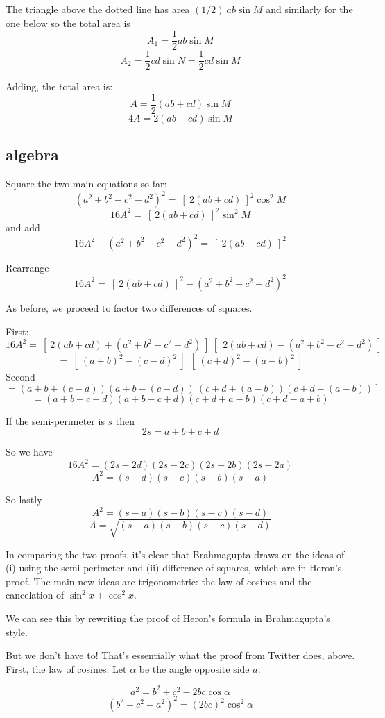 \documentclass[11pt, oneside]{article}
\begin{document}
The triangle above the dotted line has area $(1/2) \ ab \sin M$ and similarly for the one below so the total area is
\[ A_1 = \frac{1}{2} ab \sin M \]
\[ A_2 = \frac{1}{2} cd \sin N = \frac{1}{2} cd \sin M \]

Adding, the total area is:
\[ A  =  \frac{1}{2}(ab + cd) \sin M \]
\[ 4A =  2(ab + cd) \sin M \]

\subsection*{algebra}

Square the two main equations so far:
\[ (a^2 + b^2 - c^2 - d^2)^2 =  \ [ \ 2(ab + cd) \ ]^2 \cos^2 M \]
\[ 16A^2 =  \ [ \ 2(ab + cd) \ ]^2 \sin^2 M \]
and add
\[ 16A^2 + (a^2 + b^2 - c^2 - d^2)^2 =   \ [ \ 2(ab + cd) \ ]^2 \]

Rearrange
\[ 16A^2 =   \ [ \ 2(ab + cd) \ ]^2 - (a^2 + b^2 - c^2 - d^2)^2 \]

As before, we proceed to factor two differences of squares.  

First:
\[ 16A^2 =   \ [ \ 2(ab + cd) + (a^2 + b^2 - c^2 - d^2) \ ] \ [ \ \ 2(ab + cd) - (a^2 + b^2 - c^2 - d^2) \ ] \]
\[ = \ [ \ (a + b)^2 - (c - d)^2 \ ] \  \ [ \ (c + d)^2 - (a - b)^2 \ ] \]
Second
\[ = (a + b + (c - d))(a + b - (c - d)) \ (c + d + (a - b))(c + d - (a - b)) \ ] \]
\[ = (a + b + c - d)(a + b - c + d)(c + d + a - b)(c + d - a + b) \]

If the semi-perimeter is $s$ then
\[ 2s = a + b + c + d \]

So we have
\[ 16A^2 = (2s - 2d)(2s - 2c)(2s - 2b)(2s - 2a) \]
\[ A^2 = (s - d)(s - c)(s - b)(s - a) \]

So lastly
\[ A^2 = (s - a)(s - b)(s - c)(s - d) \]
\[ A = \sqrt{(s - a)(s - b)(s - c)(s - d)} \]

In comparing the two proofs, it's clear that Brahmagupta draws on the ideas of (i) using the semi-perimeter and (ii) difference of squares, which are in Heron's proof.  The main new ideas are trigonometric:  the law of cosines and the cancelation of $\sin^2 x + \cos^2 x$.

We can see this by rewriting the proof of Heron's formula in Brahmagupta's style.  

But we don't have to!  That's essentially what the proof from Twitter does, above.  First, the law of cosines.  Let $\alpha$ be the angle opposite side $a$:

\[ a^2 = b^2 + c^2 - 2bc \cos \alpha \]
\[ (b^2 + c^2 - a^2)^2 = (2bc)^2 \cos^2 \alpha \]
\end{document}
